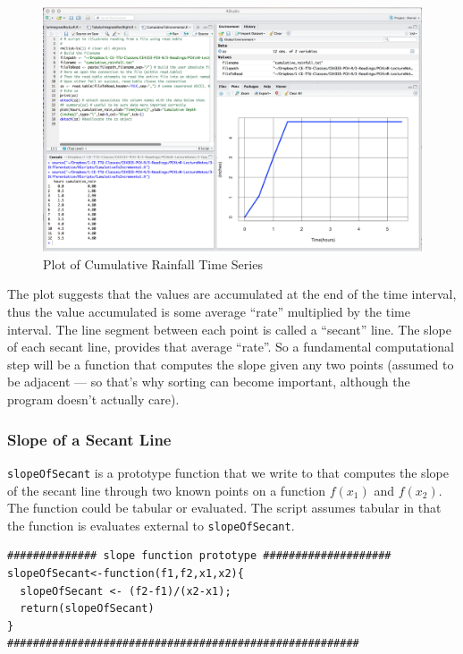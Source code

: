 \begin{figure}[htbp] %
   \centering
   \includegraphics[width=6in]{./3-Differentation/cumulative_rain_plot.jpg} 
   \caption{Plot of Cumulative Rainfall Time Series}
   \label{fig:cumulative_rain_plot}
\end{figure}

The plot suggests that the values are accumulated at the end of the time interval, thus the value accumulated is some average ``rate'' multiplied by the time interval.  
The line segment between each point is called a ``secant'' line.  
The slope of each secant line, provides that average ``rate''.  
So a fundamental computational step will be a function that computes the slope given any two points (assumed to be adjacent --- so that's why sorting can become important, although the program doesn't actually care).

\subsubsection{Slope of a Secant Line}
\texttt{slopeOfSecant} is a prototype function that we write to that computes the slope of the secant line through two known points on a function $f(x_1)$ and $f(x_2)$.  The function could be tabular or evaluated.  The script assumes tabular in that the function is evaluates external to \texttt{slopeOfSecant}.  

\begin{lstlisting}[caption=R code demonstrating the prototype function \texttt{slopeOfSecant} , label=lst:SlopeOfSecant]
############## slope function prototype ####################
slopeOfSecant<-function(f1,f2,x1,x2){
  slopeOfSecant <- (f2-f1)/(x2-x1);
  return(slopeOfSecant)
}
#######################################################
\end{lstlisting}


